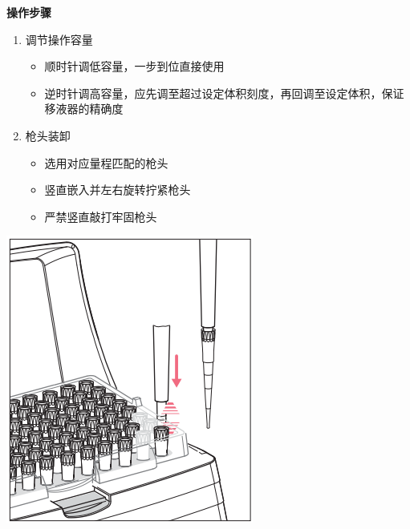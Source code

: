\documentclass[
]{book}
\providecommand{\tightlist}{%
  \setlength{\itemsep}{0pt}\setlength{\parskip}{0pt}}
\begin{document}
\textbf{操作步骤}

\begin{enumerate}
\def\labelenumi{\arabic{enumi}.}
\tightlist
\item
  调节操作容量

  \begin{itemize}
  \tightlist
  \item
    顺时针调低容量，一步到位直接使用
  \item
    逆时针调高容量，应先调至超过设定体积刻度，再回调至设定体积，保证移液器的精确度
  \end{itemize}
\item
  枪头装卸

  \begin{itemize}
  \tightlist
  \item
    选用对应量程匹配的枪头
  \item
    竖直嵌入并左右旋转拧紧枪头
  \item
    严禁竖直敲打牢固枪头
  \end{itemize}
\end{enumerate}

\begin{center}\includegraphics[width=0.3\linewidth]{images/Pasted image 20220803013705} \end{center}
\end{document}

